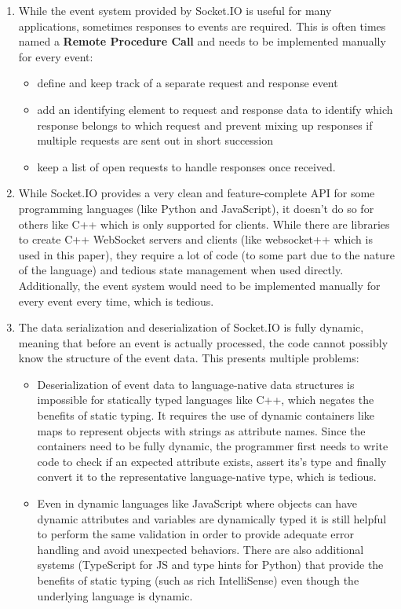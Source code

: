 \documentclass[conference]{IEEEtran}
\begin{document}
\begin{enumerate}
    \item While the event system provided by Socket.IO is useful for many applications, sometimes responses to events are required. This is often times named a \textbf{Remote Procedure Call} and needs to be implemented manually for every event:
    \begin{itemize}
        \item define and keep track of a separate request and response event
        \item add an identifying element to request and response data to identify which response belongs to which request and prevent mixing up responses if multiple requests are sent out in short succession
        \item keep a list of open requests to handle responses once received.
    \end{itemize}
    \item While Socket.IO provides a very clean and feature-complete API for some programming languages (like Python and JavaScript), it doesn't do so for others like C++ which is only supported for clients. While there are libraries to create C++ WebSocket servers and clients (like websocket++ which is used in this paper), they require a lot of code (to some part due to the nature of the language) and tedious state management when used directly. Additionally, the event system would need to be implemented manually for every event every time, which is tedious. \cite{b4}
    \item The data serialization and deserialization of Socket.IO is fully dynamic, meaning that before an event is actually processed, the code cannot possibly know the structure of the event data. This presents multiple problems:
    \begin{itemize}
        \item Deserialization of event data to language-native data structures is impossible for statically typed languages like C++, which negates the benefits of static typing. It requires the use of dynamic containers like maps to represent objects with strings as attribute names. Since the containers need to be fully dynamic, the programmer first needs to write code to check if an expected attribute exists, assert its's type and finally convert it to the representative language-native type, which is tedious.
        \item Even in dynamic languages like JavaScript where objects can have dynamic attributes and variables are dynamically typed it is still helpful to perform the same validation in order to provide adequate error handling and avoid unexpected behaviors. There are also additional systems (TypeScript for JS and type hints for Python) that provide the benefits of static typing (such as rich IntelliSense) even though the underlying language is dynamic.
    \end{itemize}
\end{enumerate}
\end{document}
